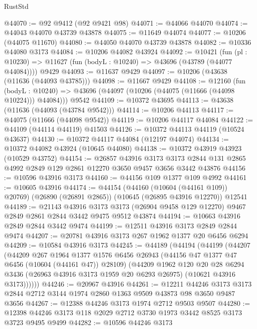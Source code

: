 \begin{lexlean}{RustStd}
\begin{coremodule}
@44070 := @92 @9412 (@92 @9421 @98)
@44071 := @44066 @44070
@44074 := @44043 @44070 @43739 @43878
@44075 := @11649 @44074
@44077 := @10206 (@44075 @11670)
@44080 := @44050 @44070 @43739 @43878
@44082 := @10336 @44080 @3173
@44084 := @10206 @44082 @43924
@44092 := @10421
    (fun (pl : @10230) => @11627 (fun (bodyL : @10240) => @43696 (@43789 (@44077 @44084))))
    @9429
@44093 := @11637 @9429
@44097 := @10206 (@43638 (@11636 (@44093 @43785)))
@44098 := @11667 @9429
@44108 := @12160
    (fun (bodyL : @10240) => @43696 (@44097 (@10206 (@44075 (@11666 (@44098 @10224))) @44084)))
    @9542
@44109 := @10372 @43695
@44113 := @43638 (@11636 (@44093 (@43784 @9542)))
@44114 := @10206 @44113
@44117 := @44075 (@11666 (@44098 @9542))
@44119 := @10206 @44117 @44084
@44122 := @44109 (@44114 @44119) @41503
@44126 := @10372 @44113 @44119 (@10524 @43637)
@44130 := @10372 @44117 @44084 (@12197 @44074)
@44134 := @10372 @44082 @43924 (@10645 @44080)
@44138 := @10372 @43919 @43923 (@10529 @43752)
@44154 := @26857
    @43916
    @3173
    @3173
    @2844
    @131
    @2865
    @4992
    @2849
    @129
    @2861
    @12270
    @3650
    @9457
    @3656
    @3442
    @43876
@44156 := @10596 @43916 @3173
@44160 := @44156 @109 @1377 @109 @4992
@44161 := @10605 @43916
@44174 := @44154
    (@44160 (@10604 (@44161 @109)) @20769)
    (@26890 (@26891 @2865))
    (@10645 (@26895 @43916 @12270))
    @12541
@44189 := @21143
    @43916
    @3173
    @3173
    (@26904 @9458 @129 @12270)
    @9467
    @2849
    @2861
    @2844
    @3442
    @9475
    @9512
    @43874
@44194 := @10663 @43916 @2849 @2844 @3442 @9474
@44199 := @12511 @43916 @3173 @2849 @2844 @9474
@44207 := @20781 @43916 @3173 @267 @1962 @1377 @20 @6456 @6294
@44209 := @10584 @43916 @3173
@44245 := @44189
    (@44194
      (@44199
        (@44207
          (@44209
            @267
            @1964
            @1377
            @1576
            @6456
            @26943
            (@44156 @47 @1377 @47 @6456 (@10604 (@44161 @47)) @28109)
            (@44209
              @1962
              @120
              @20
              @28
              @6294
              @3436
              (@26963 @43916 @3173 @1959 @20 @6293 @26975)
              (@10621 @43916 @3173))))))
@44246 := @20967 @43916
@44261 := @12211
    @44246
    @3173
    @3173
    @2844
    @2712
    @3144
    @1974
    @2860
    @1363
    @9509
    @43873
    @98
    @3650
    @9487
    @3656
@44267 := @12388 @44246 @3173 @1974 @2712 @9503 @9507
@44280 := @12398 @44246 @3173 @118 @2029 @2712 @3730 @1973 @3442 @8525 @3173 @3723 @9495 @9499
@44282 := @10596 @44246 @3173

\end{coremodule}
\end{lexlean}
